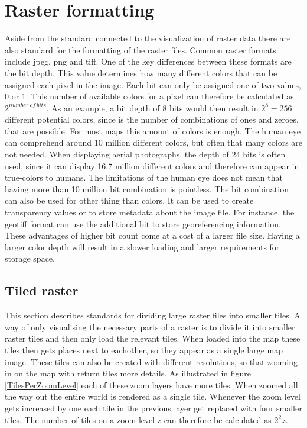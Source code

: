\chapter{Raster formatting}

Aside from the standard connected to the visualization of raster data there are also standard for the formatting of the raster files. Common raster formats include jpeg, png and tiff. One of the key differences between these formats are the bit depth. This value determines how many different colors that can be assigned each pixel in the image. Each bit can only be assigned one of two values, 0 or 1. This number of available colors for a pixel can therefore be calculated as $2^{number\: of\: bits}$. As an example, a bit depth of 8 bits would then result in $2^8 = 256$ different potential colors, since is the number of combinations of ones and zeroes, that are possible. For most maps this amount of colors is enough. The human eye can comprehend around 10 million different colors, but often that many colors are not needed. When displaying aerial photographs, the depth of 24 bits is often used, since it can display 16.7 million different colors and therefore can appear in true-colors to humans.
The limitations of the human eye does not mean that having more than 10 million bit combination is pointless. The bit combination can also be used for other thing than colors. It can be used to create transparency values or to store metadata about the image file. For instance, the geotiff format can use the additional bit to store georeferencing information.
These advantages of higher bit count come at a cost of a larger file size. Having a larger color depth will result in a slower loading and larger requirements for storage space. \citep{Dent} %

\section{Tiled raster}
This section describes standards for dividing large raster files into smaller tiles. 
A way of only visualising the necessary parts of a raster is to divide it into smaller raster tiles and then only load the relevant tiles. When loaded into the map these tiles then gets places next to eachother, so they appear as a single large map image. These tiles can also be created with different resolutions, so that zooming in on the map with return tiles more details.  As illustrated in figure \ref{TilesPerZoomLevel} each of these zoom layers have more tiles.
\citep{Liedman}
When zoomed all the way out the entire world is rendered as a single tile. Whenever the zoom level gets increased by one each tile in the previous layer get replaced with four smaller tiles. The number of tiles on a zoom level z can therefore be calculated as $2^2z$.
\citep{SlippyMap}

